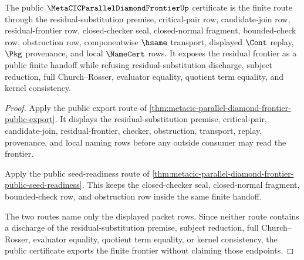 \begin{theorem}
\label{thm:metacic-parallel-diamond-frontier-public-certificate}
The public $\MetaCICParallelDiamondFrontierUp$ certificate is the finite route through the residual-substitution premise, critical-pair row, candidate-join row, residual-frontier row, closed-checker seal, closed-normal fragment, bounded-check row, obstruction row, componentwise $\hsame$ transport, displayed $\Cont$ replay, $\Pkg$ provenance, and local $\NameCert$ rows. It exposes the residual frontier as a public finite handoff while refusing residual-substitution discharge, subject reduction, full Church--Rosser, evaluator equality, quotient term equality, and kernel consistency.
\end{theorem}
\begin{proof}
Apply the public export route of \autoref{thm:metacic-parallel-diamond-frontier-public-export}. It displays the residual-substitution premise, critical-pair, candidate-join, residual-frontier, checker, obstruction, transport, replay, provenance, and local naming rows before any outside consumer may read the frontier.

Apply the public seed-readiness route of \autoref{thm:metacic-parallel-diamond-frontier-public-seed-readiness}. This keeps the closed-checker seal, closed-normal fragment, bounded-check row, and obstruction row inside the same finite handoff.

The two routes name only the displayed packet rows. Since neither route contains a discharge of the residual-substitution premise, subject reduction, full Church--Rosser, evaluator equality, quotient term equality, or kernel consistency, the public certificate exports the finite frontier without claiming those endpoints.
\end{proof}

